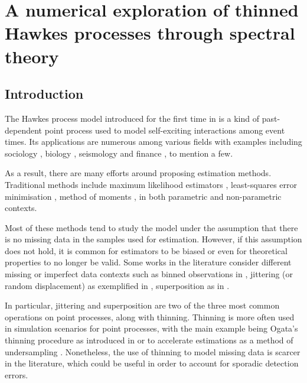 
\chapter[][]{A numerical exploration of thinned Hawkes processes through spectral theory}\label{chapter:spectral_thinning}

\section{Introduction}

The Hawkes process model introduced for the first time in \textcite{Hawkes1971} is a kind of past-dependent point process used to model self-exciting interactions among event times. 
Its applications are numerous among various fields with examples including sociology \parencite{Linderman2014},
biology \parencite{Gupta2018, Lambert2018, Rizoiu2018},
seismology \parencite{Ogata1988, Ogata1998}
and finance \parencite{Bacry2013, Bacry2015, Hawkes2018}, to mention a few.

As a result, there are many efforts around proposing estimation methods. Traditional methods include maximum likelihood estimators \parencite{Ogata1978, Ozaki1979}, least-squares error minimisation \parencite{Reynaud2014,Bacry2020}, method of moments \parencite{DaFonseca2013}, in both parametric and non-parametric contexts.

Most of these methods tend to study the model under the assumption that there is no missing data in the samples used for estimation. 
However, if this assumption does not hold, it is common for estimators to be biased or even for theoretical properties to no longer be valid.
Some works in the literature consider different missing or imperfect data contexts such as binned observations in \textcite{Cheysson2022}, jittering (or random displacement) as exemplified in \textcite{Antoniadis2006,Bonnet2022}, superposition as in \textcite{Bonnet2024}. 

In particular, jittering and superposition are two of the three most common operations on point processes, along with thinning.
Thinning is more often used in simulation scenarios for point processes, 
with the main example being Ogata's thinning procedure as introduced in \parencite{Ogata1981} or to accelerate estimations as a method of undersampling \parencite{Li2019}.
Nonetheless, the use of thinning to model missing data is scarcer in the literature, 
which could be useful in order to account for sporadic detection errors.


